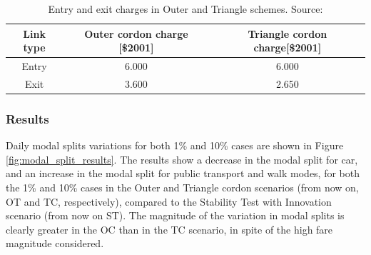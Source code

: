 \documentclass[Journal,letterpaper]{ascelike-new}
\begin{document}
\begin{table}[h!]
	\centering
	\caption{Entry and exit charges in Outer and Triangle schemes. Source: \cite{gleave2009tarificacion}}
	\label{table:cordon_charges}
	\begin{tabular}{ccc}
		\hline
		Link type& Outer cordon charge {[}\$2001{]} & Triangle cordon charge{[}\$2001{]}\\
		\hline
		Entry & 6.000 & 6.000   \\
		Exit  & 3.600 & 2.650 \\
		\hline          
	\end{tabular}
\end{table}

\subsubsection{Results}

Daily modal splits variations for both 1\% and 10\% cases are shown in Figure \ref{fig:modal_split_results}. The results show a decrease in the modal split for car, and an increase in the modal split for public transport and walk modes, for both the 1\% and 10\% cases in the Outer and Triangle cordon scenarios (from now on, OT and TC, respectively), compared to the Stability Test with Innovation scenario (from now on ST). The magnitude of the variation in modal splits is clearly greater in the OC than in the TC scenario, in spite of the high fare magnitude considered. 
\end{document}
